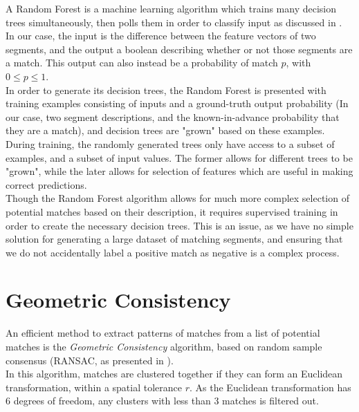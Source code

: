 A Random Forest is a machine learning algorithm which trains many decision trees simultaneously, then polls them in order to classify input as discussed in \cite{breiman2001random}.\\

In our case, the input is the difference between the feature vectors of two segments, and the output a boolean describing whether or not those segments are a match. This output can also instead be a probability of match $p$, with $0 \leq p \leq 1$.\\

In order to generate its decision trees, the Random Forest is presented with training examples consisting of inputs and a ground-truth output probability (In our case, two segment descriptions, and the known-in-advance probability that they are a match), and decision trees are "grown" based on these examples. During training, the randomly generated trees only have access to a subset of examples, and a subset of input values. The former allows for different trees to be "grown", while the later allows for selection of features which are useful in making correct predictions.\\

Though the Random Forest algorithm allows for much more complex selection of potential matches based on their description, it requires supervised training in order to create the necessary decision trees. This is an issue, as we have no simple solution for generating a large dataset of matching segments, and ensuring that we do not accidentally label a positive match as negative is a complex process.\\

\section{Geometric Consistency}
\label{sec:filtering}

An efficient method to extract patterns of matches from a list of potential matches is the \textit{Geometric Consistency} algorithm, based on random sample consensus (RANSAC, as presented in \citet{fischler1981random}).\\

In this algorithm, matches are clustered together if they can form an Euclidean transformation, within a spatial tolerance $r$. As the Euclidean transformation has 6 degrees of freedom, any clusters with less than 3 matches is filtered out.\\

